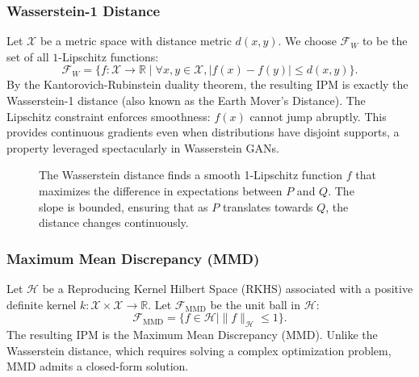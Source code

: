 \subsubsection{Wasserstein-1 Distance}
Let $\mathcal{X}$ be a metric space with distance metric $d(x, y)$. We choose $\mathcal{F}_{W}$ to be the set of all $1$-Lipschitz functions:
\begin{equation}
    \mathcal{F}_{W} = \{ f : \mathcal{X} \to \mathbb{R} \mid \forall x, y \in \mathcal{X}, |f(x) - f(y)| \le d(x, y) \}.
\end{equation}
By the Kantorovich-Rubinstein duality theorem, the resulting IPM is exactly the Wasserstein-1 distance (also known as the Earth Mover's Distance). 
The Lipschitz constraint enforces smoothness: $f(x)$ cannot jump abruptly. This provides continuous gradients even when distributions have disjoint supports, a property leveraged spectacularly in Wasserstein GANs.

\begin{figure}[htbp]
\centering
{}
\caption{The Wasserstein distance finds a smooth 1-Lipschitz function $f$ that maximizes the difference in expectations between $P$ and $Q$. The slope is bounded, ensuring that as $P$ translates towards $Q$, the distance changes continuously.}
\label{fig:wasserstein_ipm}
\end{figure}

\subsubsection{Maximum Mean Discrepancy (MMD)}
Let $\mathcal{H}$ be a Reproducing Kernel Hilbert Space (RKHS) associated with a positive definite kernel $k: \mathcal{X} \times \mathcal{X} \to \mathbb{R}$. Let $\mathcal{F}_{\text{MMD}}$ be the unit ball in $\mathcal{H}$:
\begin{equation}
    \mathcal{F}_{\text{MMD}} = \{ f \in \mathcal{H} \mid \| f \|_{\mathcal{H}} \le 1 \}.
\end{equation}
The resulting IPM is the Maximum Mean Discrepancy (MMD). Unlike the Wasserstein distance, which requires solving a complex optimization problem, MMD admits a closed-form solution.

